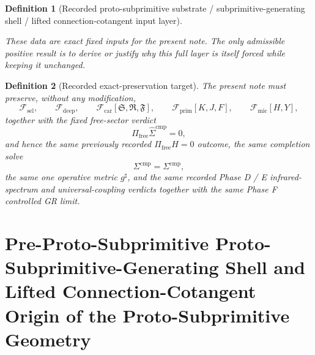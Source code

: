 \documentclass[11pt]{article}
\newcommand{\CompletedMetric}{g^{\sharp}}
\newcommand{\CompShift}{\Sigma^{\mathrm{cmp}}}
\newcommand{\CompLift}{\widehat\Sigma^{\mathrm{cmp}}}
\newcommand{\FreeProj}{\Pi_{\mathrm{free}}}
\newcommand{\GaugeAux}{Y}
\newcommand{\MicFunctional}{\mathscr F_{\mathrm{mic}}}
\newcommand{\PrimFunctional}{\mathscr F_{\mathrm{prim}}}
\newcommand{\CarrierFunctional}{\mathscr F_{\mathrm{car}}}
\newcommand{\DeepFunctional}{\mathscr F_{\mathrm{deep}}}
\newcommand{\StemFunctional}{\mathscr F_{\mathrm{sel}}}
\newcommand{\PrimStrain}{K}
\newcommand{\PrimNeutral}{J}
\newcommand{\PrimFree}{F}
\newcommand{\CarrierSeed}{\mathfrak S}
\newcommand{\RelabelSeed}{\mathfrak R}
\newcommand{\FreeSeed}{\mathfrak F}
\newtheorem{definition}{Definition}
\begin{document}
\begin{definition}[Recorded proto-subprimitive substrate / subprimitive-generating shell / lifted connection-cotangent input layer]
\begin{enumerate}
\end{enumerate}
These data are exact fixed inputs for the present note. The only admissible positive result is to derive or justify why this full layer is itself forced while keeping it unchanged.
\end{definition}

\begin{definition}[Recorded exact-preservation target]
\label{def:recorded_target}
The present note must preserve, without any modification,
\begin{equation}
\StemFunctional,
\qquad
\DeepFunctional,
\qquad
\CarrierFunctional[\CarrierSeed,\RelabelSeed,\FreeSeed],
\qquad
\PrimFunctional[\PrimStrain,\PrimNeutral,\PrimFree],
\qquad
\MicFunctional[H,\GaugeAux],
\label{eq:target_functionals}
\end{equation}
together with the fixed free-sector verdict
\begin{equation}
\FreeProj\CompLift=0,
\label{eq:target_free}
\end{equation}
and hence the same previously recorded \(\Pi_{\mathrm{free}}H=0\) outcome, the same completion solve
\begin{equation}
\CompShift=\Sigma^{\mathrm{cmp}},
\label{eq:target_sigma}
\end{equation}
the same one operative metric \(\CompletedMetric\), and the same recorded Phase D / E infrared-spectrum and universal-coupling verdicts together with the same Phase F controlled GR limit.
\end{definition}

\section{Pre-Proto-Subprimitive Proto-Subprimitive-Generating Shell and Lifted Connection-Cotangent Origin of the Proto-Subprimitive Geometry}
\end{document}
